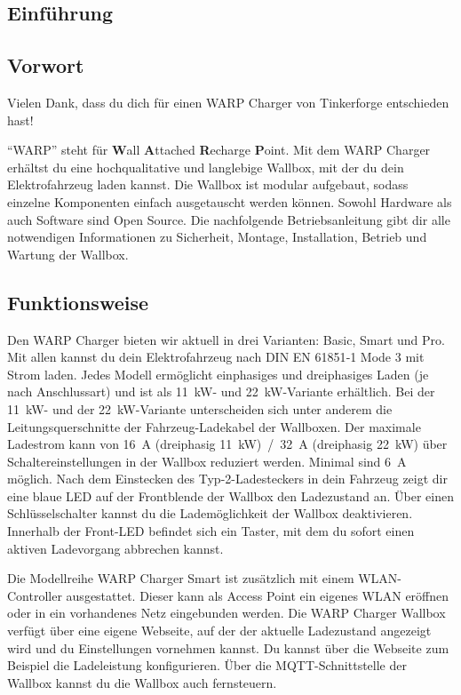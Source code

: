 \documentclass[a4paper,10pt]{article}
\begin{document}
\begin{multicols*}{2}
	\tableofcontents \section{Einführung}
	\subsection{Vorwort} Vielen Dank, dass du
	dich für einen WARP Charger von Tinkerforge entschieden hast!

	\enquote{WARP} steht
	für \textbf{W}all \textbf{A}ttached
	\textbf{R}echarge \textbf{P}oint. Mit dem WARP Charger
	erhältst du eine hochqualitative und langlebige Wallbox, mit der du dein
	Elektrofahrzeug laden kannst. Die Wallbox ist modular aufgebaut, sodass
	einzelne Komponenten einfach ausgetauscht werden können. Sowohl Hardware als
	auch Software sind Open Source. Die nachfolgende Betriebsanleitung gibt dir
	alle notwendigen Informationen zu Sicherheit, Montage, Installation, Betrieb
	und Wartung der Wallbox.

	\subsection{Funktionsweise}
	Den WARP Charger bieten wir aktuell in drei Varianten: Basic, Smart und Pro.
	Mit allen kannst du dein Elektrofahrzeug nach DIN EN 61851‐1 Mode 3 mit Strom
	laden. Jedes Modell ermöglicht einphasiges und dreiphasiges Laden (je nach
	Anschlussart) und ist als \SI{11}{\kilo\watt}- und
	\SI{22}{\kilo\watt}-Variante erhältlich. Bei der \SI{11}{\kilo\watt}- und
	der \SI{22}{\kilo\watt}-Variante unterscheiden sich unter anderem die
	Leitungsquerschnitte der Fahrzeug-Ladekabel der Wallboxen. Der maximale Ladestrom
	kann von \SI{16}{\ampere}
	(dreiphasig \SI{11}{\kilo\watt})~/~\SI{32}{\ampere} (dreiphasig \SI{22}{\kilo\watt}) über
	Schaltereinstellungen in der Wallbox reduziert werden. Minimal sind
	\SI{6}{\ampere} möglich. Nach dem Einstecken des Typ-2-Ladesteckers in
	dein Fahrzeug zeigt dir eine blaue LED auf der Frontblende der Wallbox den
	Ladezustand an. Über einen Schlüsselschalter kannst du die Lademöglichkeit der
	Wallbox deaktivieren. Innerhalb der Front-LED befindet sich ein Taster, mit dem
	du sofort einen aktiven Ladevorgang abbrechen kannst.

	Die Modellreihe WARP Charger Smart ist zusätzlich mit einem WLAN-Controller
	ausgestattet. Dieser kann als \nohyphens{Access} Point ein eigenes WLAN eröffnen oder in
	ein vorhandenes Netz eingebunden werden. Die WARP Charger Wallbox verfügt über
	eine eigene Webseite, auf der der aktuelle Ladezustand angezeigt wird und du
	Einstellungen vornehmen kannst. Du kannst über die Webseite zum Beispiel die
	Ladeleistung konfigurieren. Über die MQTT-Schnittstelle der Wallbox kannst du
	die Wallbox auch fernsteuern.


\end{multicols*}
\end{document}
